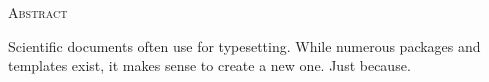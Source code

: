 \begin{center}
  {\Huge \textsc{Abstract}}
\end{center}
%
\noindent
%
Scientific documents often use for typesetting.
While numerous packages and templates exist, it makes sense to create a new one.
Just because.
